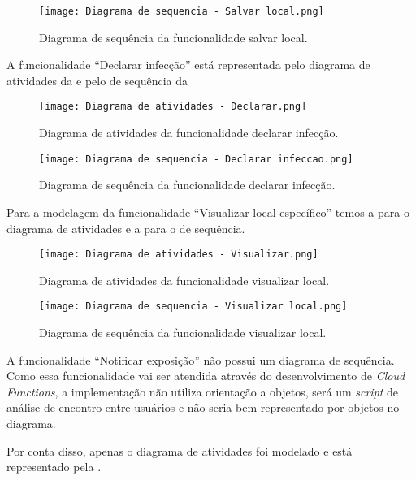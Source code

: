 \begin{figure}[!htb]
  \centering
  \texttt{[image: Diagrama de sequencia - Salvar local.png]}
  \caption{Diagrama de sequência da funcionalidade salvar local.}
  \label{fig:sequenciasalvar}
\end{figure}



A funcionalidade “Declarar infecção” está representada pelo diagrama de atividades da  e pelo de sequência da 

\begin{figure}[!htb]
  \centering
  \texttt{[image: Diagrama de atividades - Declarar.png]}
  \caption{Diagrama de atividades da funcionalidade declarar infecção.}
  \label{fig:atividadedeclarar}
\end{figure}

\begin{figure}[!htb]
  \centering
  \texttt{[image: Diagrama de sequencia - Declarar infeccao.png]}
  \caption{Diagrama de sequência da funcionalidade declarar infecção.}
  \label{fig:sequenciadeclarar}
\end{figure}

Para a modelagem da funcionalidade “Visualizar local específico” temos a  para o diagrama de atividades e a  para o de sequência.

\begin{figure}[!htb]
  \centering
  \texttt{[image: Diagrama de atividades - Visualizar.png]}
  \caption{Diagrama de atividades da funcionalidade visualizar local.}
  \label{fig:atividadevisualizar}
\end{figure}

\begin{figure}[!htb]
  \centering
  \texttt{[image: Diagrama de sequencia - Visualizar local.png]}
  \caption{Diagrama de sequência da funcionalidade visualizar local.}
  \label{fig:sequenciavisualizar}
\end{figure}

A funcionalidade “Notificar exposição” não possui um diagrama de sequência. Como essa funcionalidade vai ser atendida através do desenvolvimento de \textit{Cloud Functions}, a implementação não utiliza orientação a objetos, será um \textit{script} de análise de encontro entre usuários e não seria bem representado por objetos no diagrama.

Por conta disso, apenas o diagrama de atividades foi modelado e está representado pela .

